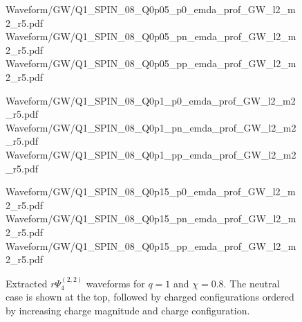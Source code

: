 \begin{figure}[p]
\centering
{}

\vspace{0.6em}

{Waveform/GW/Q1_SPIN_08_Q0p05_p0_emda_prof_GW_l2_m2_r5.pdf}
\hfill
{}
{Waveform/GW/Q1_SPIN_08_Q0p05_pn_emda_prof_GW_l2_m2_r5.pdf}
\hfill
{}
{Waveform/GW/Q1_SPIN_08_Q0p05_pp_emda_prof_GW_l2_m2_r5.pdf}

\vspace{0.6em}

{Waveform/GW/Q1_SPIN_08_Q0p1_p0_emda_prof_GW_l2_m2_r5.pdf}
\hfill
{}
{Waveform/GW/Q1_SPIN_08_Q0p1_pn_emda_prof_GW_l2_m2_r5.pdf}
\hfill
{}
{Waveform/GW/Q1_SPIN_08_Q0p1_pp_emda_prof_GW_l2_m2_r5.pdf}

\vspace{0.6em}

{Waveform/GW/Q1_SPIN_08_Q0p15_p0_emda_prof_GW_l2_m2_r5.pdf}
\hfill
{}
{Waveform/GW/Q1_SPIN_08_Q0p15_pn_emda_prof_GW_l2_m2_r5.pdf}
\hfill
{}
{Waveform/GW/Q1_SPIN_08_Q0p15_pp_emda_prof_GW_l2_m2_r5.pdf}

\caption[Gravitational-wave catalog for $q=1$, $\chi=0.8$]{
Extracted $r\Psi_4^{(2,2)}$ waveforms for $q=1$ and $\chi=0.8$. The neutral case is shown at the top, followed by charged configurations ordered by increasing charge magnitude and charge configuration.
}
\label{fig:gw_catalog_q1_chi08}
\end{figure}



